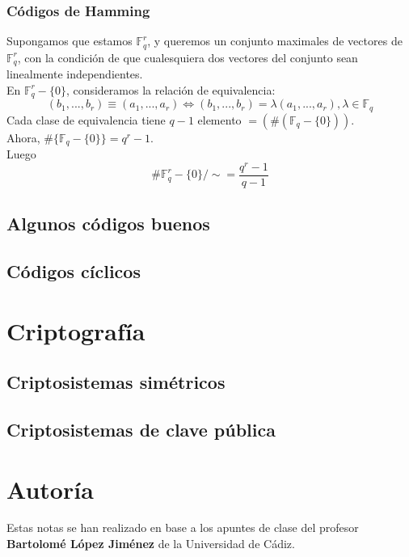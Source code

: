 \documentclass[spanish]{book}
\begin{document}
\subsection{Códigos de Hamming}
Supongamos que estamos $\mathbb{F}_q^r$, y queremos un conjunto maximales de vectores de $\mathbb{F}_q^r$, con la condición de que cualesquiera dos vectores del conjunto sean linealmente independientes. \\
En $\mathbb{F}_q^r-\{0\}$, consideramos la relación de equivalencia:
$$(b_1, ..., b_r) \equiv (a_1, ..., a_r) \Longleftrightarrow (b_1, ..., b_r)= \lambda (a_1, ..., a_r), \lambda \in \mathbb{F}_q$$
Cada clase de equivalencia tiene $q-1$ elemento $=(\#(\mathbb{F}_q-\{0\}))$. \\
Ahora, $\#\{ \mathbb{F}_q - \{0\} \}=q^r-1$. \\
Luego $$\# \mathbb{F}_q^r-\{0\}/\sim = \frac{q^r-1}{q-1}$$
\section{Algunos códigos buenos}
\section{Códigos cíclicos}

\chapter{Criptografía}
\section{Criptosistemas simétricos}
\section{Criptosistemas de clave pública}

\chapter*{Autoría}
Estas notas se han realizado en base a los apuntes de clase del profesor \textbf{Bartolomé López Jiménez} de la Universidad de Cádiz.
\end{document}
